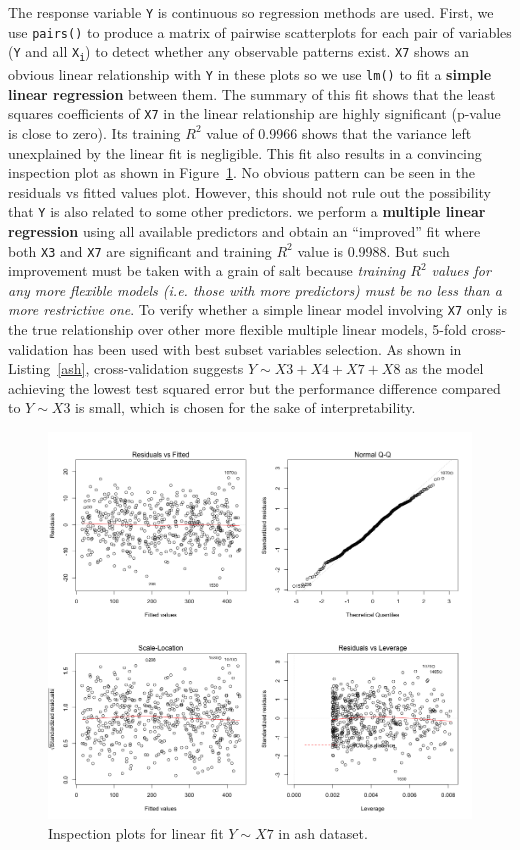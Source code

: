 \documentclass{article}
\begin{document}
The response variable {\tt Y} is continuous so regression methods are used. First, we use {\tt pairs()} to produce a matrix of pairwise scatterplots for each pair of variables ({\tt Y} and all {\tt X\textsubscript{i}}) to detect whether any observable patterns exist. {\tt X7} shows an obvious linear relationship with {\tt Y} in these plots so we use {\tt lm()} to fit a \textbf{simple linear regression} between them. The summary of this fit shows that the least squares coefficients of {\tt X7} in the linear relationship are highly significant (p-value is close to zero). Its training $R^2$ value of 0.9966 shows that the variance left unexplained by the linear fit is negligible. This fit also results in a convincing inspection plot as shown in Figure~\ref{fig:01-ash}. No obvious pattern can be seen in the residuals vs fitted values plot. However, this should not rule out the possibility that {\tt Y} is also related to some other predictors. we perform a \textbf{multiple linear regression} using all available predictors and obtain an ``improved'' fit where both {\tt X3} and {\tt X7} are significant and training $R^2$ value is 0.9988. But such improvement must be taken with a grain of salt because {\em training $R^2$ values for any more flexible models (i.e. those with more predictors) must be no less than a more restrictive one}. To verify whether a simple linear model involving {\tt X7} only is the true relationship over other more flexible multiple linear models, 5-fold cross-validation has been used with best subset variables selection. As shown in Listing~\ref{ash}, cross-validation suggests $Y \sim X3+X4+X7+X8$ as the model achieving the lowest test squared error but the performance difference compared to $Y \sim X3$ is small, which is chosen for the sake of interpretability.

\begin{figure}[h!]
  \includegraphics[width=\linewidth]{project/images/01-ash.png}
  \caption{Inspection plots for linear fit $Y \sim X7$ in ash dataset.}
  \label{fig:01-ash}
\end{figure}
\end{document}
